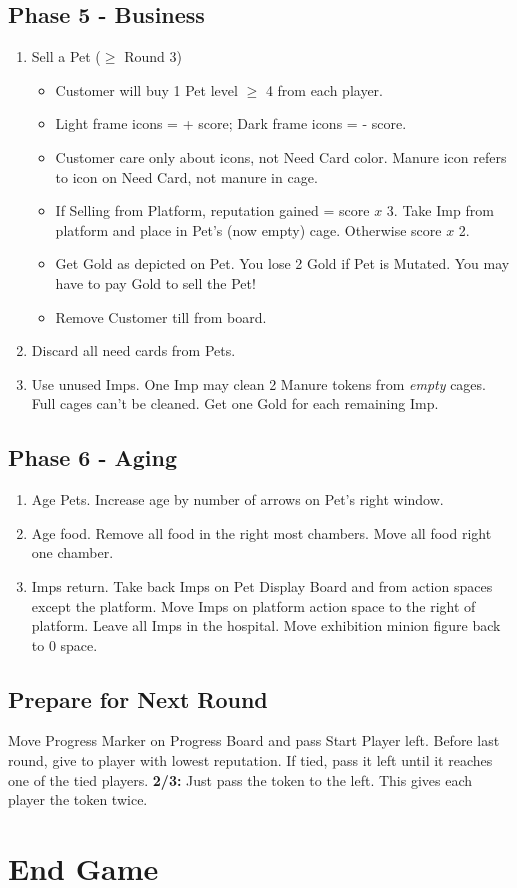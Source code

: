 \documentclass[12pt]{article}
\newenvironment{enumerateCustom}
{\begin{enumerate}
  \setlength{\itemsep}{1pt}
  \setlength{\parskip}{0pt}
  \setlength{\parsep}{0pt}}
{\end{enumerate}}
\newenvironment{itemizeCustom}
{\begin{itemize}
  \setlength{\itemsep}{1pt}
  \setlength{\parskip}{0pt}
  \setlength{\parsep}{0pt}}
{\end{itemize}}
\begin{document}
\begin{multicols*}{2}
\subsection*{Phase 5 - Business}
\begin{enumerateCustom}
	\item Sell a Pet ($\ge$ Round 3)
		\begin{itemizeCustom}
			\item Customer will buy 1 Pet level $\ge$ 4 from each player.
			\item Light frame icons = + score; Dark frame icons = - score.
			\item Customer care only about icons, not Need Card color. Manure icon refers to icon on Need Card, not manure in cage.
			\item If Selling from Platform, reputation gained = score $x$ 3. Take Imp from platform and place in Pet's (now empty) cage. Otherwise score $x$ 2.
			\item Get Gold as depicted on Pet. You lose 2 Gold if Pet is Mutated. You may have to pay Gold to sell the Pet!
			\item Remove Customer till from board.
		\end{itemizeCustom}
	\item Discard all need cards from Pets.
	\item Use unused Imps. One Imp may clean 2 Manure tokens from \emph{empty} cages. Full cages can't be cleaned. Get one Gold for each remaining Imp.
\end{enumerateCustom}

\subsection*{Phase 6 - Aging}
\begin{enumerateCustom}
	\item Age Pets. Increase age by number of arrows on Pet's right window.
	\item Age food. Remove all food in the right most chambers. Move all food right one chamber.
	\item Imps return. Take back Imps on Pet Display Board and from action spaces except the platform. Move Imps on platform action space to the right of platform. Leave all Imps in the hospital. Move exhibition minion figure back to 0 space.
\end{enumerateCustom}

\subsection*{Prepare for Next Round}
Move Progress Marker on Progress Board and pass Start Player left. Before last round, give to player with lowest reputation. If tied, pass it left until it reaches one of the tied players. \textbf{2/3:} Just pass the token to the left. This gives each player the token twice.

\section*{End Game}

\end{multicols*}
\end{document}
